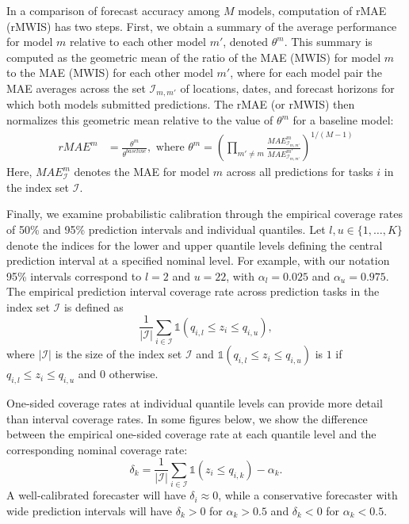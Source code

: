 \documentclass{article}\usepackage[]{graphicx}\usepackage[]{xcolor}
\begin{document}
In a comparison of forecast accuracy among $M$ models, computation of rMAE (rMWIS) has two steps. First, we obtain a summary of the average performance for model $m$ relative to each other model $m'$, denoted $\theta^m$. This summary is computed as the geometric mean of the ratio of the MAE (MWIS) for model $m$ to the MAE (MWIS) for each other model $m'$, where for each model pair the MAE averages across the set $\mathcal{I}_{m, m'}$ of locations, dates, and forecast horizons for which both models submitted predictions. The rMAE (or rMWIS) then normalizes this geometric mean relative to the value of $\theta^m$ for a baseline model:
\begin{align*}
rMAE^m &= \frac{\theta^m}{\theta^{baseline}},
\text{ where } \theta^m = \left( \prod_{m' \neq m} \frac{MAE_{\mathcal{I}_{m, m'}}^m}{MAE_{\mathcal{I}_{m, m'}}^{m'}} \right)^{1/(M-1)}
\end{align*}
Here, $MAE_{\mathcal{I}}^m$ denotes the MAE for model $m$ across all predictions for tasks $i$ in the index set $\mathcal{I}$.

Finally, we examine probabilistic calibration through the empirical coverage rates of 50\% and 95\% prediction intervals and individual quantiles. Let $l, u \in \{1, \ldots, K\}$ denote the indices for the lower and upper quantile levels defining the central prediction interval at a specified nominal level. For example, with our notation 95\% intervals correspond to $l = 2$ and $u = 22$, with $\alpha_l = 0.025$ and $\alpha_u = 0.975$. The empirical prediction interval coverage rate across prediction tasks in the index set $\mathcal{I}$ is defined as
$$\frac{1}{\vert \mathcal{I} \vert} \sum_{i \in \mathcal{I}} \mathds{1}(q_{i,l} \leq z_i \leq q_{i,u}),$$
where $\vert \mathcal{I} \vert$ is the size of the index set $\mathcal{I}$ and $\mathds{1}(q_{i,l} \leq z_i \leq q_{i,u})$ is $1$ if $q_{i,l} \leq z_i \leq q_{i,u}$ and $0$ otherwise.

One-sided coverage rates at individual quantile levels can provide more detail than interval coverage rates. In some figures below, we show the difference between the empirical one-sided coverage rate at each quantile level and the corresponding nominal coverage rate:
$$\delta_k = \frac{1}{\vert \mathcal{I} \vert} \sum_{i \in \mathcal{I}} \mathds{1}(z_i \leq q_{i,k}) - \alpha_k.$$
A well-calibrated forecaster will have $\delta_i \approx 0$, while a conservative forecaster with wide prediction intervals will have $\delta_k > 0$ for $\alpha_k > 0.5$ and $\delta_k < 0$ for $\alpha_k < 0.5$.
\end{document}

